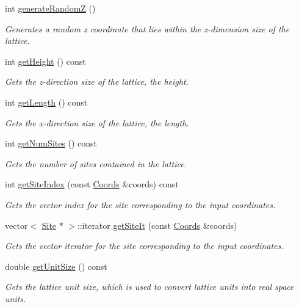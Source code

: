 \begin{DoxyCompactItemize}
int \hyperlink{class_lattice_a96006397a6ab389fb1eee87fde6e2165}{generate\+RandomZ} ()
\begin{DoxyCompactList}\small\item\em Generates a random z coordinate that lies within the z-\/dimension size of the lattice. \end{DoxyCompactList}\item 
int \hyperlink{class_lattice_aaa0cba3ab33ac620d9b9f9508c56d1ac}{get\+Height} () const
\begin{DoxyCompactList}\small\item\em Gets the z-\/direction size of the lattice, the height. \end{DoxyCompactList}\item 
int \hyperlink{class_lattice_a4b43b67a36fcd3dfe62c9eeaffa561d2}{get\+Length} () const
\begin{DoxyCompactList}\small\item\em Gets the x-\/direction size of the lattice, the length. \end{DoxyCompactList}\item 
int \hyperlink{class_lattice_ae8046ebe4dbbe34b03548384ae79d4ae}{get\+Num\+Sites} () const
\begin{DoxyCompactList}\small\item\em Gets the number of sites contained in the lattice. \end{DoxyCompactList}\item 
int \hyperlink{class_lattice_abafcbcee9689c0cf7a21134095075604}{get\+Site\+Index} (const \hyperlink{struct_coords}{Coords} \&coords) const
\begin{DoxyCompactList}\small\item\em Gets the vector index for the site corresponding to the input coordinates. \end{DoxyCompactList}\item 
vector$<$ \hyperlink{class_site}{Site} $\ast$ $>$\+::iterator \hyperlink{class_lattice_a46f7d12855d24e1bdd02814621b0a178}{get\+Site\+It} (const \hyperlink{struct_coords}{Coords} \&coords)
\begin{DoxyCompactList}\small\item\em Gets the vector iterator for the site corresponding to the input coordinates. \end{DoxyCompactList}\item 
double \hyperlink{class_lattice_ac6963a6b2b4b8d96d3417f6e9c2a509d}{get\+Unit\+Size} () const
\begin{DoxyCompactList}\small\item\em Gets the lattice unit size, which is used to convert lattice units into real space units. \end{DoxyCompactList}\item 

\end{DoxyCompactItemize}
